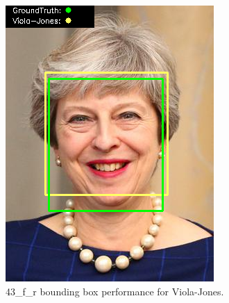 \documentclass{l4proj}
\begin{document}
\begin{appendices}
\begin{figure}[h!]
\begin{minipage}{0.49\textwidth}
     \includegraphics[width=\textwidth]{images/appendix/viola/43.png}
    \caption{43\_f\_r bounding box performance for Viola-Jones.}
    \label{whoopi_result}
  \end{minipage}
\end{figure}


\end{appendices}
\end{document}
